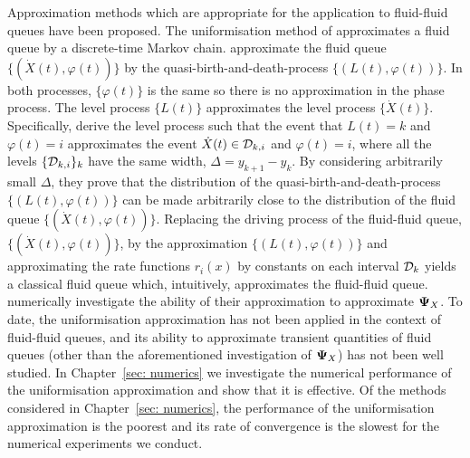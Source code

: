 Approximation methods which are appropriate for the application to fluid-fluid queues have been proposed. The uniformisation method of \cite{bo2013} approximates a fluid queue by a discrete-time Markov chain. \cite{bo2013} approximate the fluid queue \(\{(\dot X(t),\varphi(t))\}\) by the quasi-birth-and-death-process \(\{(L(t),\varphi(t))\}\). In both processes, \(\{\varphi(t)\}\) is the same so there is no approximation in the phase process. The level process \(\{L(t)\}\) approximates the level process \(\{\dot X(t)\}\). Specifically, \cite{bo2013} derive the level process such that the event that \(L(t)=k\) and \(\varphi(t)=i\) approximates the event \(\dot X(t)\in \mathcal{D}_{k,i}\) and \(\varphi(t)=i\), where all the levels \(\{\mathcal{D}_{k,i}\}_{k}\) have the same width, \(\Delta=y_{k+1}-y_k\). By considering arbitrarily small \(\Delta\), they prove that the distribution of the quasi-birth-and-death-process \(\{(L(t),\varphi(t))\}\) can be made arbitrarily close to the distribution of the fluid queue \(\{(\dot X(t),\varphi(t))\}\). Replacing the driving process of the fluid-fluid queue, \(\{(\dot X(t),\varphi(t))\}\), by the approximation \(\{(L(t),\varphi(t))\}\) and approximating the rate functions \(r_i(x)\) by constants on each interval \(\mathcal{D}_k\) yields a classical fluid queue which, intuitively, approximates the fluid-fluid queue. \cite{bo2013} numerically investigate the ability of their approximation to approximate \(\boldsymbol \Psi_X\). To date, the uniformisation approximation has not been applied in the context of fluid-fluid queues, and its ability to approximate transient quantities of fluid queues (other than the aforementioned investigation of \(\boldsymbol\Psi_X\)) has not been well studied. In Chapter~\ref{sec: numerics} we investigate the numerical performance of the uniformisation approximation and show that it is effective. Of the methods considered in Chapter~\ref{sec: numerics}, the performance of the uniformisation approximation is the poorest and its rate of convergence is the slowest for the numerical experiments we conduct. %


